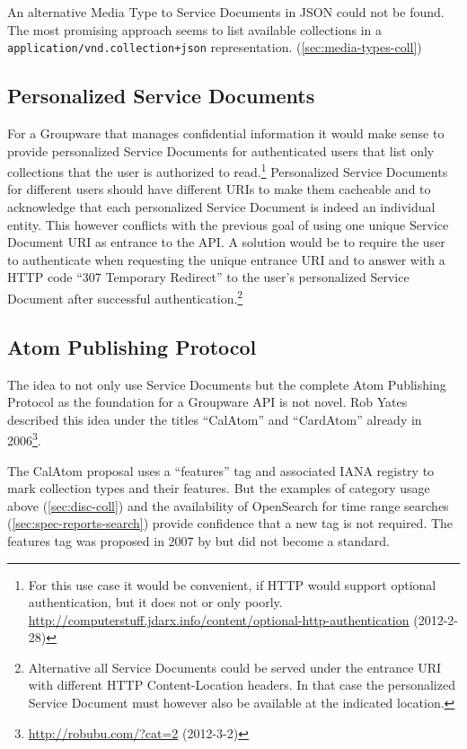 \documentclass[12pt,a4paper,twoside]{scrartcl}		%
\newcommand{\citeurl}[2]{\url{#1} (#2)}
\begin{document}
An alternative Media Type to Service Documents in JSON could not be found. The
most promising approach seems to list available collections in a
\lstinline:application/vnd.collection+json: representation. (\autoref{sec:media-types-coll})

\subsection{Personalized Service Documents} For a Groupware that manages
confidential information it would make sense to provide personalized Service
Documents for authenticated users that list only collections that the user is
authorized to read.\footnote{For this use case it would be convenient, if HTTP
  would support optional authentication, but it does not or only
  poorly. \citeurl{http://computerstuff.jdarx.info/content/optional-http-authentication}{2012-2-28}}
Personalized Service Documents for different users should have different URIs to
make them cacheable and to acknowledge that each personalized Service Document
is indeed an individual entity. This however conflicts with the previous goal of
using one unique Service Document URI as entrance to the API. A solution would
be to require the user to authenticate when requesting the unique entrance URI
and to answer with a HTTP code ``307 Temporary Redirect'' to the user's
personalized Service Document after successful
authentication.\footnote{Alternative all Service Documents could be served under
  the entrance URI with different HTTP Content-Location
  headers\cite[sec. 14.14]{RFC2616}. In that case the personalized Service
  Document must however also be available at the indicated location.}


\subsection{Atom Publishing Protocol}
\label{sec:atom-publ-prot}

The idea to not only use Service Documents but the complete Atom Publishing
Protocol as the foundation for a Groupware API is not novel. Rob Yates described
this idea under the titles ``CalAtom'' and ``CardAtom'' already in
2006\footnote{\citeurl{http://robubu.com/?cat=2}{2012-3-2}}.

The CalAtom\cite{draft-yates-atompub-calatom-00.txt} proposal uses a
``features'' tag and associated IANA registry to mark collection types and their
features. But the examples of category usage above (\autoref{sec:disc-coll}) and
the availability of OpenSearch for time range searches
(\autoref{sec:spec-reports-search}) provide confidence that a new tag is not
required. The features tag was proposed in 2007 by
\cite{draft-snell-atompub-feature} but did not become a standard.
\end{document}
